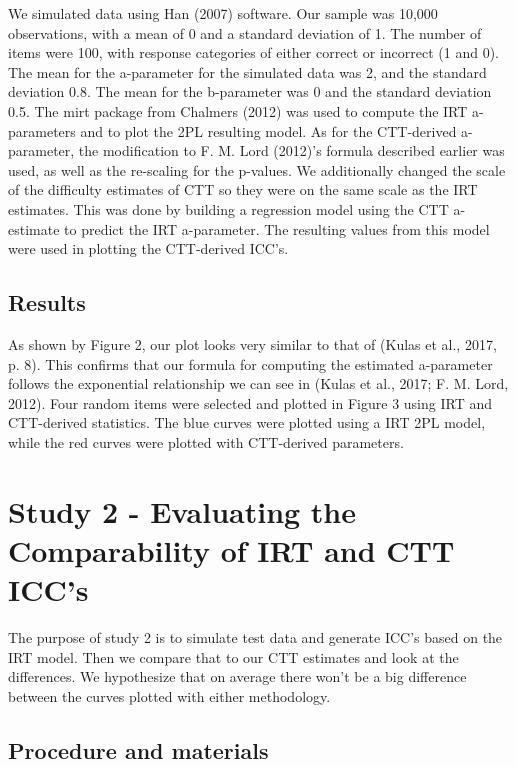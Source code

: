 \documentclass[
  man]{apa6}
\begin{document}
We simulated data using Han (2007) software. Our sample was 10,000 observations, with a mean of 0 and a standard deviation of 1. The number of items were 100, with response categories of either correct or incorrect (1 and 0). The mean for the a-parameter for the simulated data was 2, and the standard deviation 0.8. The mean for the b-parameter was 0 and the standard deviation 0.5. The mirt package from Chalmers (2012) was used to compute the IRT a-parameters and to plot the 2PL resulting model. As for the CTT-derived a-parameter, the modification to F. M. Lord (2012)'s formula described earlier was used, as well as the re-scaling for the p-values. We additionally changed the scale of the difficulty estimates of CTT so they were on the same scale as the IRT estimates. This was done by building a regression model using the CTT a-estimate to predict the IRT a-parameter. The resulting values from this model were used in plotting the CTT-derived ICC's.

\hypertarget{results}{%
\subsection{Results}\label{results}}

As shown by Figure 2, our plot looks very similar to that of (Kulas et al., 2017, p. 8). This confirms that our formula for computing the estimated a-parameter follows the exponential relationship we can see in (Kulas et al., 2017; F. M. Lord, 2012). Four random items were selected and plotted in Figure 3 using IRT and CTT-derived statistics. The blue curves were plotted using a IRT 2PL model, while the red curves were plotted with CTT-derived parameters.

\hypertarget{study-2---evaluating-the-comparability-of-irt-and-ctt-iccs}{%
\section{Study 2 - Evaluating the Comparability of IRT and CTT ICC's}\label{study-2---evaluating-the-comparability-of-irt-and-ctt-iccs}}

The purpose of study 2 is to simulate test data and generate ICC's based on the IRT model. Then we compare that to our CTT estimates and look at the differences. We hypothesize that on average there won't be a big difference between the curves plotted with either methodology.

\hypertarget{procedure-and-materials}{%
\subsection{Procedure and materials}\label{procedure-and-materials}}
\end{document}
